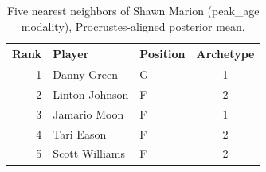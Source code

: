\begin{table}[htbp]
  \centering\small
  \begin{tabular}{rllc}
    \toprule
    Rank & Player & Position & Archetype \\
    \midrule
    1 & Danny Green & G & 1 \\
    2 & Linton Johnson & F & 2 \\
    3 & Jamario Moon & F & 1 \\
    4 & Tari Eason & F & 2 \\
    5 & Scott Williams & F & 2 \\
    \bottomrule
  \end{tabular}
  \caption{Five nearest neighbors of Shawn Marion (peak_age modality), Procrustes-aligned posterior mean.}
  \label{tab:Shawn_Marion_neighbors_peak_age}
\end{table}

